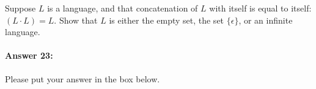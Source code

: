 \documentclass[10pt]{article}
\newenvironment{AnswerBox}{\begin{mdframed}[style=simple]}{\end{mdframed}}
\begin{document}
Suppose $L$ is a language, and that concatenation of $L$ with itself is equal to
itself: $(L\cdot L) = L$. Show that $L$ is either the empty set,  the set
$\{\epsilon\}$, or an infinite language.

\paragraph{Answer 23:} Please put your answer in the box below.

\begin{AnswerBox}%


\end{AnswerBox}%
\end{document}

